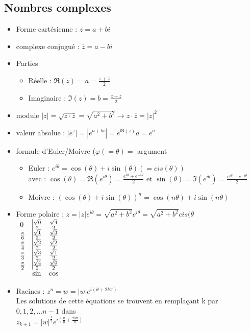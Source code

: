 \documentclass[12pt,a4paper]{article}
\begin{document}
\subsection{Nombres complexes}
\begin{itemize}
	 \item Forme cartésienne : $z = a+bi$
	 \item complexe conjugué : $\overline{z} = a-bi$
	 \item Parties
	 \begin{itemize}
	 	\item Réelle : $\Re(z) = a = \frac{z+\overline{z}}{2}$
	 	\item Imaginaire : $\Im(z) = b = \frac{z-\overline{z}}{2}$
	 \end{itemize}
	 \item module $|z| = \sqrt{z\cdot\overline{z}} = \sqrt{a^2 + b^2} \to z\cdot \overline{z} = |z|^2$
	 \item valeur absolue : $|e^z| = |e^{a+bi}| = e^{\Re(z)}a = e^a$
	 \item formule d'Euler/Moivre ($\varphi (= \theta) =$ argument
	 \begin{itemize}
	 	\item Euler : $e^{i\theta} = \cos(\theta) + i \sin (\theta) (=cis(\theta))$\\
	 	avec : $\cos(\theta) = \Re(e^{i\theta}) = \frac{e^{i\theta}+e^{-i\theta}}{2}$ et $\sin(\theta) = \Im(e^{i\theta}) = \frac{e^{i\theta} - e^{-i\theta}}{2}$
	 	\item Moivre : $(\cos(\theta) + i \sin(\theta))^n = \cos(n\theta) + i\sin(n\theta)$
	 \end{itemize}
	 \item Forme polaire : $z = |z|e^{i\theta} = \sqrt{a^2 + b^2}e^{i\theta} = \sqrt{a^2+b^2}cis(\theta$\\
	 $\begin{array}{lll}
	 0 & \vline \frac{\sqrt{0}}{2} & \frac{\sqrt{4}}{2}\\
	 \frac{\pi}{6} &\vline  \frac{\sqrt{1}}{2} & \frac{\sqrt{3}}{2}\\
	 \frac{\pi}{4} &\vline \frac{\sqrt{2}}{2} & \frac{\sqrt{2}}{2}\\
	 \frac{\pi}{3} &\vline \frac{\sqrt{3}}{2} & \frac{\sqrt{1}}{2}\\
	 \frac{\pi}{2} &\vline \frac{\sqrt{4}}{2} & \frac{\sqrt{0}}{2}\\
	& \sin & \cos
	 \end{array}$
	\item Racines : $z^n = w = |w|e^{i(\theta+2k\pi)}$\\
	Les solutions de cette équations se trouvent en remplaçant k par $0,1,2,... n-1$ dans\\
	$z_{k+1} = |w|^\frac{1}{2}e^{i(\frac{\theta}{n} + \frac{2k\pi}{n})}$
\end{itemize}
\end{document}
